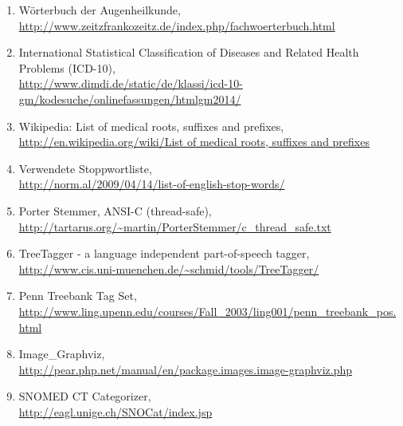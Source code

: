 \documentclass[pagesize,paper=A4,DIV=calc,fontsize=12pt,draft=false]{scrreprt}
\begin{document}
\begin{enumerate}
\item Wörterbuch der Augenheilkunde, \\
\href{http://www.zeitzfrankozeitz.de/index.php/fachwoerterbuch.html}{http://www.zeitzfrankozeitz.de/index.php/fachwoerterbuch.html}
\item International Statistical Classification of Diseases and Related Health Problems (ICD-10), \\
\href{http://www.dimdi.de/static/de/klassi/icd-10-gm/kodesuche/onlinefassungen/htmlgm2014/index.htm}{http://www.dimdi.de/static/de/klassi/icd-10-gm/kodesuche/onlinefassungen/htmlgm2014/}
\item Wikipedia: List of medical roots, suffixes and prefixes, \\
\href{http://en.wikipedia.org/wiki/List\_of\_medical\_roots,\_suffixes\_and\_prefixes}{http://en.wikipedia.org/wiki/List of medical roots, suffixes and prefixes}
\item Verwendete Stoppwortliste, \\ 
\href{http://norm.al/2009/04/14/list-of-english-stop-words/}{http://norm.al/2009/04/14/list-of-english-stop-words/}
\item Porter Stemmer, ANSI-C (thread-safe), \\
\href{http://tartarus.org/~martin/PorterStemmer/c_thread_safe.txt}{http://tartarus.org/\textasciitilde martin/PorterStemmer/c\_thread\_safe.txt}
\item TreeTagger - a language independent part-of-speech tagger, \\
\href{http://www.cis.uni-muenchen.de/~schmid/tools/TreeTagger/}{http://www.cis.uni-muenchen.de/\textasciitilde schmid/tools/TreeTagger/}
\item Penn Treebank Tag Set, \\
\href{http://www.ling.upenn.edu/courses/Fall_2003/ling001/penn_treebank_pos.html}{http://www.ling.upenn.edu/courses/Fall\_2003/ling001/penn\_treebank\_pos.html}
\item Image\_Graphviz, \\
\href{http://pear.php.net/manual/en/package.images.image-graphviz.php}{http://pear.php.net/manual/en/package.images.image-graphviz.php}
\item SNOMED CT Categorizer, \\
\href{http://eagl.unige.ch/SNOCat/index.jsp}{http://eagl.unige.ch/SNOCat/index.jsp}
\end{enumerate}
\end{document}
